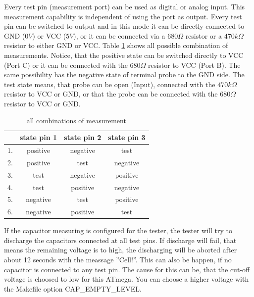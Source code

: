 Every test pin (measurement port) can be used as digital or analog input. This measurement capability is
independent of using the port as output.
Every test pin can be switched to output and in this mode it can be directly connected to GND (\(0V\)) or VCC (\(5V\)), 
or it can be connected via a \(680\Omega\) resistor or a \(470k\Omega\) resistor to either GND or VCC.
Table \ref{tab:case} shows all possible combination of measurements.
Notice, that the positive state can be switched directly to VCC (Port C) or it can be connected with the 
\(680\Omega\) resistor to VCC (Port B). The same possibility has the negative state of terminal probe to the GND side.
The test state means, that probe can be open (Input), connected with the \(470k\Omega\) resistor to VCC or GND,
or that the probe can be connected with the \(680\Omega\) resistor to VCC or GND.

\begin{table}[H]
  \begin{center}
    \begin{tabular}{| l | c | c | c |}
    \hline
      & state pin 1 & state pin 2 & state pin 3 \\
    \hline
   1. & positive    &  negative    &  test \\
   2. & positive    &  test       & negative \\
   3. & test        &  negative    & positive \\
   4. & test        &  positive    & negative \\
   5. & negative     &  test       & positive \\
   6. & negative     &  positive    &  test  \\
    \hline
    \end{tabular}
  \end{center}
  \caption{all combinations of measurement}
  \label{tab:case} 
\end{table}

If the capacitor measuring is configured for the tester, the tester will try to discharge the capacitors connected at all
test pins.
If discharge will fail, that means the remaining voltage is to high, the discharging will be aborted after about 12 seconds
with the meassage ''Cell!''. This can also be happen, if no capacitor is connected to any test pin.
The cause for this can be, that the cut-off voltage is choosed to low for this ATmega.
You can choose a higher voltage with the Makefile option CAP\_EMPTY\_LEVEL.
